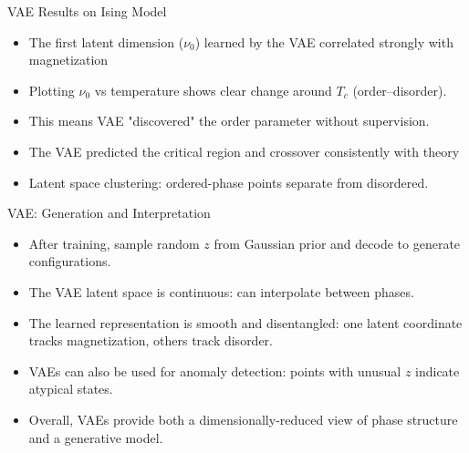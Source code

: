 \documentclass{beamer}
\begin{document}
\begin{frame}{VAE Results on Ising Model}
 \begin{itemize}
   \item The first latent dimension ($\nu_0$) learned by the VAE correlated strongly with magnetization 
   \item Plotting $\nu_0$ vs temperature shows clear change around $T_c$ (order–disorder).
   \item This means VAE "discovered" the order parameter without supervision.
   \item The VAE predicted the critical region and crossover consistently with theory 
   \item Latent space clustering: ordered-phase points separate from disordered.
 \end{itemize}
\end{frame}

\begin{frame}{VAE: Generation and Interpretation}
 \begin{itemize}
   \item After training, sample random $z$ from Gaussian prior and decode to generate configurations.
   \item The VAE latent space is continuous: can interpolate between phases.
   \item The learned representation is smooth and disentangled: one latent coordinate tracks magnetization, others track disorder.
   \item VAEs can also be used for anomaly detection: points with unusual $z$ indicate atypical states.
   \item Overall, VAEs provide both a dimensionally-reduced view of phase structure and a generative model.
 \end{itemize}
\end{frame}
\end{document}
